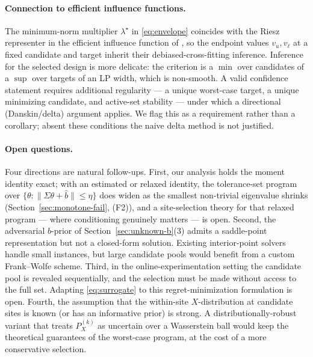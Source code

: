 \paragraph{Connection to efficient influence functions.}
The minimum-norm multiplier $\lambda^\star$ in \eqref{eq:envelope} coincides with
the Riesz representer in the efficient influence function of
\citet[Eq.~2.9]{boyarsky2026}, so the endpoint values $v_u,v_\ell$ at a
fixed candidate and target inherit their debiased-cross-fitting inference.
Inference for the selected design is more delicate: the criterion is a
$\min$ over candidates of a $\sup$ over targets of an LP width, which is
non-smooth. A valid confidence statement requires additional regularity --- a
unique worst-case target, a unique minimizing candidate, and active-set
stability --- under which a directional (Danskin/delta) argument applies. We flag
this as a requirement rather than a corollary; absent these conditions the naive
delta method is not justified.

\paragraph{Open questions.}
Four directions are natural follow-ups. First, our analysis holds the moment
identity exact; with an estimated or relaxed identity, the tolerance-set
program over $\{\theta:\|\widehat\Sigma\theta+\widehat b\|\le\eta\}$ does widen
as the smallest non-trivial eigenvalue shrinks (Section~\ref{sec:monotone-fail},
(F2)), and a site-selection theory for that relaxed program --- where
conditioning genuinely matters --- is open. Second, the adversarial $b$-prior of
Section~\ref{sec:unknown-b}(3) admits a saddle-point representation but not a
closed-form solution. Existing interior-point solvers handle small instances,
but large candidate pools would benefit from a custom Frank--Wolfe scheme.
Third, in the online-experimentation setting the candidate pool is revealed
sequentially, and the selection must be made without access to the full set.
Adapting \eqref{eq:surrogate} to this regret-minimization formulation is open.
Fourth, the assumption that the within-site $X$-distribution at candidate sites
is known (or has an informative prior) is strong. A distributionally-robust
variant that treats $P_X^{(k)}$ as uncertain over a Wasserstein ball would keep
the theoretical guarantees of the \citet{jeong2020assessing} worst-case program,
at the cost of a more conservative selection.

